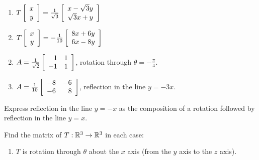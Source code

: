 \begin{multicols}{2}
\begin{ex}
\begin{enumerate}[label={\alph*.}]
\item $T \left[ \begin{array}{c}
x \\
y
\end{array} \right] = \tfrac{1}{\sqrt{3}} \left[ \begin{array}{c}
x - \sqrt{3}y \\
\sqrt{3}x + y
\end{array} \right]$

\item $T \left[ \begin{array}{c}
x \\
y
\end{array} \right] = -\tfrac{1}{10} \left[ \begin{array}{c}
8x + 6y \\
6x - 8y
\end{array} \right]$

\end{enumerate}
\begin{sol}
\begin{enumerate}[label={\alph*.}]
\setcounter{enumi}{1}
\item $A = \tfrac{1}{\sqrt{2}} \left[ \begin{array}{rr}
1 & 1 \\
-1 & 1
\end{array} \right]$, rotation through $\theta = -\frac{\pi}{4}$.

\setcounter{enumi}{3}
\item $A = \tfrac{1}{10} \left[ \begin{array}{rr}
-8 & -6 \\
-6 & 8
\end{array} \right]$, reflection in the line $y = -3x$.

\end{enumerate}
\end{sol}
\end{ex}

\begin{ex}
Express reflection in the line $y = -x$ as the composition of a rotation followed by reflection in the line $y = x$.
\end{ex}

\begin{ex}
Find the matrix of $T : \mathbb{R}^3 \to \mathbb{R}^3$ in each case:

\begin{enumerate}[label={\alph*.}]
\item $T$ is rotation through $\theta$ about the $x$ axis (from the $y$ axis to the $z$ axis).


\end{enumerate}
\end{ex}
\end{multicols}
